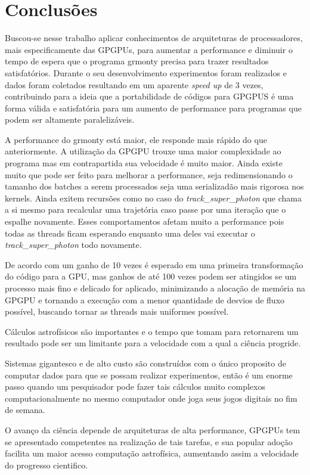 \chapter{Conclusões}
\label{cap:conclusoes}

Buscou-se nesse trabalho aplicar conhecimentos de arquiteturas de processadores, mais especificamente das GPGPUs, para aumentar a performance e diminuir o tempo de espera que o programa grmonty precisa para trazer resultados satisfatórios. Durante o seu desenvolvimento experimentos foram realizados e dados foram coletados resultando em um aparente \textit{speed up} de 3 vezes, contribuindo para a ideia que a portabilidade de códigos para GPGPUS é uma forma válida e satisfatória para um aumento de performance para programas que podem ser altamente paralelizáveis.

A performance do grmonty está maior, ele responde mais rápido do que anteriormente. A utilização da GPGPU trouxe uma maior complexidade ao programa mas em contrapartida sua velocidade é muito maior. Ainda existe muito que pode ser feito para melhorar a performance, seja redimensionando o tamanho dos batches a serem processados seja uma serializadão mais rigorosa nos kernels. Ainda exitem recursões como no caso do \textit{track\_super\_photon} que chama a si mesmo para recalcular uma trajetória caso passe por uma iteração que o espalhe novamente. Esses comportamentos afetam muito a performance pois todas as threads ficam esperando enquanto uma deles vai executar o \textit{track\_super\_photon} todo novamente.

De acordo com \citep{massively:16} um ganho de 10 vezes é esperado em uma primeira transformação do código para a GPU, mas ganhos de até 100 vezes podem ser atingidos se um processo mais fino e delicado for aplicado, minimizando a alocação de memória na GPGPU e tornando a execução com a menor quantidade de desvios de fluxo possível, buscando tornar as threads mais uniformes possível.

Cálculos astrofísicos são importantes e o tempo que tomam para retornarem um resultado pode ser um limitante para a velocidade com a qual a ciência progride.

Sistemas gigantesco e de alto custo são construídos com o único proposito de computar dados para que se possam realizar experimentos, então é um enorme passo quando um pesquisador pode fazer tais cálculos muito complexos computacionalmente no mesmo computador onde joga seus jogos digitais no fim de semana.

O avanço da ciência depende de arquiteturas de alta performance, GPGPUs tem se apresentado competentes na realização de tais tarefas, e sua popular adoção facilita um maior acesso computação astrofísica, aumentando assim a velocidade do progresso cientifico.
